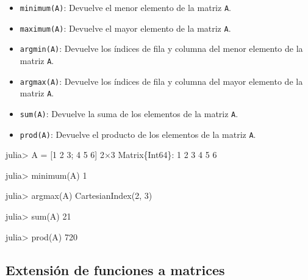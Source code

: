 \documentclass[
  letterpaper,
  DIV=11,
  numbers=noendperiod]{scrreprt}
\newenvironment{Shaded}{\begin{snugshade}}{\end{snugshade}}
\newcommand{\DataTypeTok}[1]{\textcolor[rgb]{0.68,0.00,0.00}{#1}}
\newcommand{\FloatTok}[1]{\textcolor[rgb]{0.68,0.00,0.00}{#1}}
\newcommand{\FunctionTok}[1]{\textcolor[rgb]{0.28,0.35,0.67}{#1}}
\newcommand{\NormalTok}[1]{\textcolor[rgb]{0.00,0.23,0.31}{#1}}
\newcommand{\OperatorTok}[1]{\textcolor[rgb]{0.37,0.37,0.37}{#1}}
\providecommand{\tightlist}{%
  \setlength{\itemsep}{0pt}\setlength{\parskip}{0pt}}\usepackage{longtable,booktabs,array}
\begin{document}
\begin{itemize}
\tightlist
\item
  \texttt{minimum(A)}: Devuelve el menor elemento de la matriz
  \texttt{A}.
\item
  \texttt{maximum(A)}: Devuelve el mayor elemento de la matriz
  \texttt{A}.
\item
  \texttt{argmin(A)}: Devuelve los índices de fila y columna del menor
  elemento de la matriz \texttt{A}.
\item
  \texttt{argmax(A)}: Devuelve los índices de fila y columna del mayor
  elemento de la matriz \texttt{A}.
\item
  \texttt{sum(A)}: Devuelve la suma de los elementos de la matriz
  \texttt{A}.
\item
  \texttt{prod(A)}: Devuelve el producto de los elementos de la matriz
  \texttt{A}.
\end{itemize}

\begin{Shaded}
\begin{Highlighting}[]
\NormalTok{julia}\OperatorTok{\textgreater{}}\NormalTok{ A }\OperatorTok{=}\NormalTok{ [}\FloatTok{1} \FloatTok{2} \FloatTok{3}\NormalTok{; }\FloatTok{4} \FloatTok{5} \FloatTok{6}\NormalTok{]}
\FloatTok{2}\OperatorTok{×}\FloatTok{3} \DataTypeTok{Matrix}\NormalTok{\{}\DataTypeTok{Int64}\NormalTok{\}}\OperatorTok{:}
 \FloatTok{1}  \FloatTok{2}  \FloatTok{3}
 \FloatTok{4}  \FloatTok{5}  \FloatTok{6}

\NormalTok{julia}\OperatorTok{\textgreater{}} \FunctionTok{minimum}\NormalTok{(A)}
\FloatTok{1}

\NormalTok{julia}\OperatorTok{\textgreater{}} \FunctionTok{argmax}\NormalTok{(A)}
\FunctionTok{CartesianIndex}\NormalTok{(}\FloatTok{2}\NormalTok{, }\FloatTok{3}\NormalTok{)}

\NormalTok{julia}\OperatorTok{\textgreater{}} \FunctionTok{sum}\NormalTok{(A)}
\FloatTok{21}

\NormalTok{julia}\OperatorTok{\textgreater{}} \FunctionTok{prod}\NormalTok{(A)}
\FloatTok{720}
\end{Highlighting}
\end{Shaded}

\hypertarget{extensiuxf3n-de-funciones-a-matrices}{%
\subsection{Extensión de funciones a
matrices}\label{extensiuxf3n-de-funciones-a-matrices}}
\end{document}
